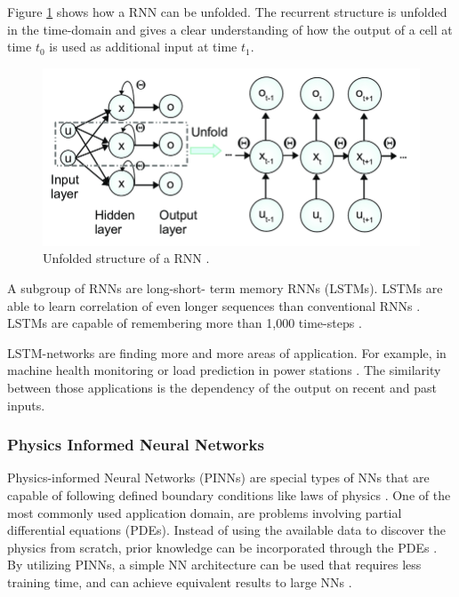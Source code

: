 Figure \ref{fig:rnn2} shows how a RNN can be unfolded. The recurrent structure is unfolded in the time-domain and gives a clear understanding of how the output of a cell at time \(t_0\) is used as additional input at time \(t_1\).

\begin{figure}[H]
	\centering
	\includegraphics[width=0.8\linewidth]{IMGs/RNN2.png}
	\caption{Unfolded structure of a RNN \cite{Guo}.}
	\label{fig:rnn2}
\end{figure}


A subgroup of RNNs are long-short- term memory RNNs (LSTMs). LSTMs are able to learn correlation of even longer sequences than conventional RNNs \cite{Salehinejad}. LSTMs are capable of remembering more than 1,000 time-steps \cite{Staudemeyer}.

LSTM-networks are finding more and more areas of application. For example, in machine health monitoring or load prediction in power stations \cite{Zhao,Muzaffar}. The similarity between those applications is the dependency of the output on recent and past inputs. 

\subsubsection*{Physics Informed Neural Networks}
Physics-informed Neural Networks (PINNs) are special types of NNs that are capable of following defined boundary conditions like laws of physics \cite{Cai}. One of the most commonly used application domain, are problems involving partial differential equations (PDEs). Instead of using the available data to discover the physics from scratch, prior knowledge can be incorporated through the PDEs \cite{Cuomo}. By utilizing PINNs, a simple NN architecture can be used that requires less training time, and can achieve equivalent results to large NNs \cite{Misyris}.

